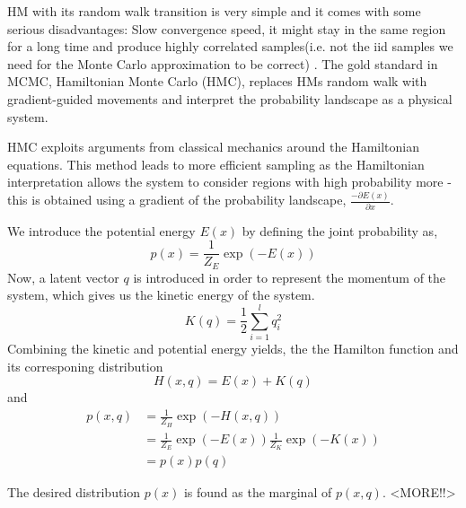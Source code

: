 HM with its random walk transition is very simple and it comes with some serious disadvantages: Slow
convergence speed, it might stay in the same region for a long time and produce highly correlated
samples(i.e. not the iid samples we need for the Monte Carlo approximation to be correct) \cite{??}.
The gold standard in MCMC, Hamiltonian Monte Carlo (HMC), replaces HMs random walk with
gradient-guided movements and interpret the probability landscape as a physical system.
 
\begin{testexample}
HMC exploits arguments from classical mechanics around the Hamiltonian equations.
This method leads to more efficient sampling as the Hamiltonian interpretation allows the system to
consider regions with high probability more - this is obtained using a gradient of the probability
landscape, $\frac{-\partial E(x)}{\partial x} $.
 
We introduce the potential energy $E(x)$ by defining the joint probability as, 
$$p(x) = \frac{1}{Z_E}\exp(-E(x))$$ Now, a latent vector $q$ is introduced in order to represent the
momentum of the system, which gives us the kinetic energy of the system. 
$$K(q) = \frac{1}{2}\sum_{i=1}^l q_i^2$$ Combining the kinetic and potential energy yields, the the
Hamilton function and its corresponing distribution
$$H(x,q)= E(x)+K(q)$$
and 
\begin{align}
    p(x,q) &= \frac{1}{Z_H} \exp(-H(x,q))\\
    &= \frac{1}{Z_E} \exp(-E(x))\frac{1}{Z_K} \exp(-K(x))\\
    &= p(x)p(q)
\end{align}

The desired distribution $p(x)$ is found as the marginal of $p(x,q)$.
<MORE!!>
\end{testexample}

